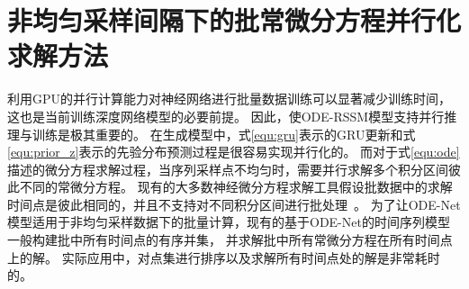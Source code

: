 \section{非均匀采样间隔下的批常微分方程并行化求解方法}
\label{sec:5_parallel_ode_solve}
利用GPU的并行计算能力对神经网络进行批量数据训练可以显著减少训练时间，这也是当前训练深度网络模型的必要前提。
因此，使ODE-RSSM模型支持并行推理与训练是极其重要的。
在生成模型中，式\eqref{equ:gru}表示的GRU更新和式\eqref{equ:prior_z}表示的先验分布预测过程是很容易实现并行化的。
而对于式\eqref{equ:ode}描述的微分方程求解过程，当序列采样点不均匀时，需要并行求解多个积分区间彼此不同的常微分方程。
现有的大多数神经微分方程求解工具假设批数据中的求解时间点是彼此相同的，并且不支持对不同积分区间进行批处理~\cite{kidger2021}。
为了让ODE-Net模型适用于非均匀采样数据下的批量计算，现有的基于ODE-Net的时间序列模型\cite{yildiz2021continuous,Rubanova2019}一般构建批中所有时间点的有序并集，
并求解批中所有常微分方程在所有时间点上的解。
实际应用中，对点集进行排序以及求解所有时间点处的解是非常耗时的。


